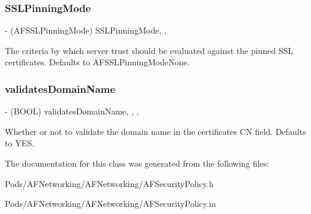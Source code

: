 \subsubsection{\texorpdfstring{S\+S\+L\+Pinning\+Mode}{SSLPinningMode}}
{\footnotesize\ttfamily -\/ (A\+F\+S\+S\+L\+Pinning\+Mode) S\+S\+L\+Pinning\+Mode\hspace{0.3cm}{\ttfamily [read]}, {\ttfamily [nonatomic]}, {\ttfamily [assign]}}

The criteria by which server trust should be evaluated against the pinned S\+SL certificates. Defaults to {\ttfamily A\+F\+S\+S\+L\+Pinning\+Mode\+None}. \mbox{\label{interface_a_f_security_policy_ae088468652f51c0f92203ef827e1aef0}} 
\subsubsection{\texorpdfstring{validates\+Domain\+Name}{validatesDomainName}}
{\footnotesize\ttfamily -\/ (B\+O\+OL) validates\+Domain\+Name\hspace{0.3cm}{\ttfamily [read]}, {\ttfamily [write]}, {\ttfamily [nonatomic]}, {\ttfamily [assign]}}

Whether or not to validate the domain name in the certificate\textquotesingle{}s CN field. Defaults to {\ttfamily Y\+ES}. 

The documentation for this class was generated from the following files\+:\begin{DoxyCompactItemize}
\item 
Pods/\+A\+F\+Networking/\+A\+F\+Networking/A\+F\+Security\+Policy.\+h\item 
Pods/\+A\+F\+Networking/\+A\+F\+Networking/A\+F\+Security\+Policy.\+m\end{DoxyCompactItemize}
